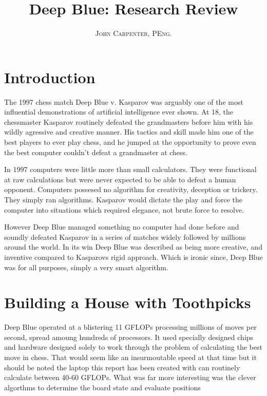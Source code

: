 \documentclass[paper=letter, fontsize=12pt]{article}
\title{\vspace{-15mm}\fontsize{24pt}{10pt}\selectfont\textbf{Deep Blue: Research Review \cite{deepblue}}} %
\author{
\large
{\textsc{John Carpenter, PEng.}}\\[2mm]}
\date{}
\begin{document}
\maketitle %
\section{Introduction}

The 1997 chess match Deep Blue v. Kasparov was arguably one of the most influential demonstrations of artificial intelligence ever shown. At 18, the chessmaster Kasparov routinely defeated
the grandmasters before him with his wildly agressive and creative manner. His tactics and skill made him one of the best players to ever play chess, and he jumped at the
opportunity to prove even the best computer couldn't defeat a grandmaster at chess.\newline

In 1997 computers were little more than small calculators. They were functional at raw calculations but were never expected to be able to defeat a human opponent. Computers possesed no algorithm for creativity, deception
or trickery. They simply ran algorithms. Kasparov would dictate the play and force the computer into situations which required elegance, not brute force to resolve. \newline

However Deep Blue managed something no computer had done before and soundly defeated Kasparov in a series of matches widely followed by millions around the world. In its win Deep Blue was described as being more creative,
and inventive compared to Kasparovs rigid approach. Which is ironic since, Deep Blue was for all purposes, simply a very smart algorithm. \newline

\section{Building a House with Toothpicks}

Deep Blue operated at a blistering 11 GFLOPs \cite{wikipedia} processing millions of moves per second, spread amoung hundreds of processors. It used specially designed chips and hardware designed solely to work through the problem of calculating the best move in chess. That would seem like an insurmoutable speed at that time but it should be noted the laptop this report has been created with can routinely calculate between 40-60 GFLOPs. What was far more interesting was the clever algorthms to determine the board state and evaluate positions\newline
\end{document}
